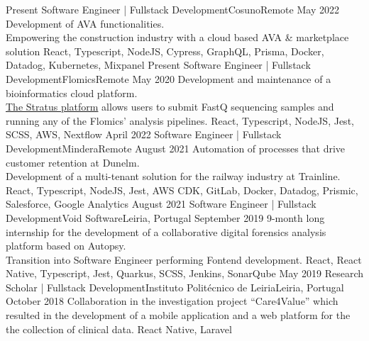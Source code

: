 %
%
%
\begin{experiences}
  \experience
  {Present} {Software Engineer | Fullstack Development}{Cosuno}{Remote}
  {May 2022} {Development of AVA functionalities.\\
    Empowering the construction industry with a cloud based AVA \& marketplace solution}
  {React, Typescript, NodeJS, Cypress, GraphQL, Prisma, Docker, Datadog, Kubernetes, Mixpanel}
  \emptySeparator
  \experience
  {Present} {Software Engineer | Fullstack Development}{Flomics}{Remote}
  {May 2020}    {Development and maintenance of a bioinformatics cloud platform.\\
    \href{https://cloud.flomics.com}{The Stratus platform} allows users to submit FastQ sequencing samples and running any of the Flomics' analysis pipelines.}
  {React, Typescript, NodeJS, Jest, SCSS, AWS, Nextflow}
  \emptySeparator
  \experience
  {April 2022}   {Software Engineer | Fullstack Development}{Mindera}{Remote}
  {August 2021} {Automation of processes that drive customer retention at Dunelm.\\
    Development of a multi-tenant solution for the railway industry at Trainline.}
  {React, Typescript, NodeJS, Jest, AWS CDK, GitLab, Docker, Datadog, Prismic, Salesforce, Google Analytics}
  \emptySeparator
  \experience
  {August 2021}     {Software Engineer | Fullstack Development}{Void Software}{Leiria, Portugal}
  {September 2019}    {9-month long internship for the development of a collaborative digital forensics analysis
    platform based on Autopsy.\\
    Transition into Software Engineer performing Fontend development.}
  {React, React Native, Typescript, Jest, Quarkus, SCSS, Jenkins, SonarQube}
  \emptySeparator
  \emptySeparator
  \experience
  {May 2019}     {Research Scholar | Fullstack Development}{Instituto Politécnico de Leiria}{Leiria, Portugal}
  {October 2018}    {Collaboration in the investigation project “Care4Value” which resulted in
    the development of a mobile application and a web platform for the 
    the collection of clinical data.}
  {React Native, Laravel}
  \emptySeparator
\end{experiences}